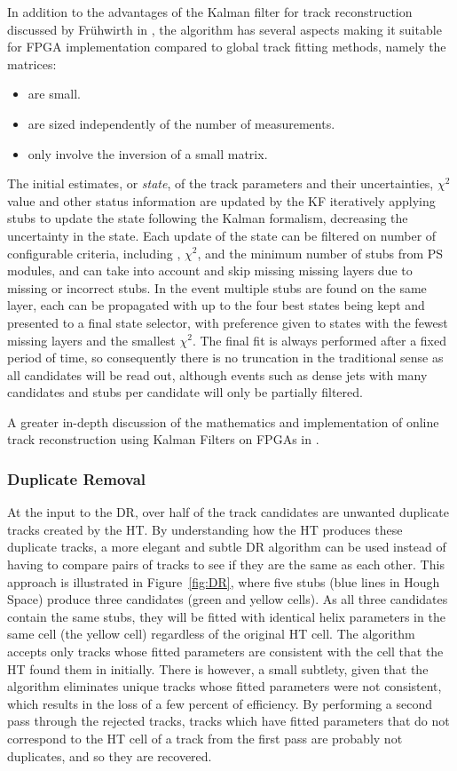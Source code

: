 In addition to the advantages of the Kalman filter for track reconstruction discussed by Fr{\"u}hwirth in \cite{Fruhwirth:1987fm}, the algorithm has several aspects making it suitable for FPGA implementation compared to global track fitting methods, namely the matrices:

\begin{itemize}
\item {are small.}
\item {are sized independently of the number of measurements.}
\item {only involve the inversion of a small matrix.}
\end{itemize}

The initial estimates, or \textit{state}, of the track parameters and their uncertainties, $\chi^2$ value and other status information are updated by the KF iteratively applying stubs to update the state following the Kalman formalism, decreasing the uncertainty in the state. 
Each update of the state can be filtered on number of configurable criteria, including \pT, $\chi^2$, and the minimum number of stubs from PS modules, and can take into account and skip missing missing layers due to missing or incorrect stubs.
In the event multiple stubs are found on the same layer, each can be propagated with up to the four best states being kept and presented to a final state selector, with preference given to states with the fewest missing layers and the smallest $\chi^2$.
The final fit is always performed after a fixed period of time, so consequently there is no truncation in the traditional sense as all candidates will be read out, although events such as dense jets with many candidates and stubs per candidate will only be partially filtered.

A greater in-depth discussion of the mathematics and implementation of online track reconstruction using Kalman Filters on FPGAs in \cite{SSummers}.

\subsubsection{Duplicate Removal}
At the input to the DR, over half of the track candidates are unwanted duplicate tracks created by the HT.
By understanding how the HT produces these duplicate tracks, a more elegant and subtle DR algorithm can be used instead of having to compare pairs of tracks to see if they are the same as each other.
This approach is illustrated in Figure~\ref{fig:DR}, where five stubs (blue lines in Hough Space) produce three candidates (green and yellow cells).
As all three candidates contain the same stubs, they will be fitted with identical helix parameters in the same cell (the yellow cell) regardless of the original HT cell.
The algorithm accepts only tracks whose fitted parameters are consistent with the cell that the HT found them in initially. 
There is however, a small subtlety, given that the algorithm eliminates unique tracks whose fitted parameters were not consistent, which results in the loss of a few percent of efficiency. 
By performing a second pass through the rejected tracks, tracks which have fitted parameters that do not correspond to the HT cell of a track from the first pass are probably not duplicates, and so they are recovered.

